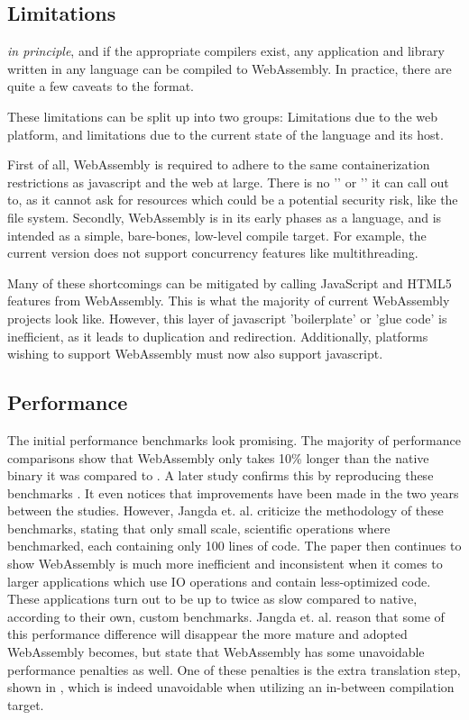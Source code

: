 \subsection*{Limitations}

\emph{in principle}, and if the appropriate compilers exist, any application and library written in any language can be compiled to WebAssembly. 
In practice, there are quite a few caveats to the format. 

These limitations can be split up into two groups: 
Limitations due to the web platform, and limitations due to the current state of the language and its host.

First of all, WebAssembly is required to adhere to the same containerization restrictions as javascript and the web at large. 
There is no '' or '' it can call out to, as it cannot ask for resources which could be a potential security risk, like the file system.
Secondly, WebAssembly is in its early phases as a language, and is intended as a simple, bare-bones, low-level compile target. 
For example, the current version does not support concurrency features like multithreading.

Many of these shortcomings can be mitigated by calling JavaScript and HTML5 features from WebAssembly. 
This is what the majority of current WebAssembly projects look like. 
However, this layer of javascript 'boilerplate' or 'glue code' is inefficient, as it leads to duplication and redirection.
Additionally, platforms wishing to support WebAssembly must now also support javascript. 

\subsection*{Performance}

The initial performance benchmarks look promising. The majority of performance comparisons show that WebAssembly only takes 10\% longer than the native binary it was compared to \cite{haas_bringing_2017}. A later study confirms this by reproducing these benchmarks \cite{jangda_not_2019}. It even notices that improvements have been made in the two years between the studies. However, Jangda et. al. criticize the methodology of these benchmarks, stating that only small scale, scientific operations where benchmarked, each containing only 100 lines of code. The paper then continues to show WebAssembly is much more inefficient and inconsistent when it comes to larger applications which use IO operations and contain less-optimized code. These applications turn out to be up to twice as slow compared to native, according to their own, custom benchmarks. 
Jangda et. al. reason that some of this performance difference will disappear the more mature and adopted WebAssembly becomes, but state that WebAssembly has some unavoidable performance penalties as well. 
One of these penalties is the extra translation step, shown in , which is indeed unavoidable when utilizing an in-between compilation target. 

